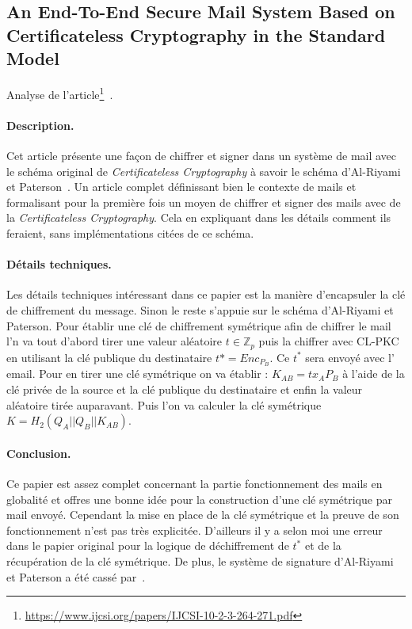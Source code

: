 \subsection{An End-To-End Secure Mail System Based on Certificateless Cryptography in the Standard Model}
Analyse de l'article\footnote{\url{https://www.ijcsi.org/papers/IJCSI-10-2-3-264-271.pdf}}~.
\paragraph*{Description.} Cet article présente une façon de chiffrer et signer dans un système de mail avec le schéma original de \textit{Certificateless Cryptography} à savoir le schéma d'Al-Riyami et Paterson~\cite{DBLP:conf/asiacrypt/Al-RiyamiP03}. Un article complet définissant bien le contexte de mails et formalisant pour la première fois un moyen de chiffrer et signer des mails avec de la \textit{Certificateless Cryptography}. Cela en expliquant dans les détails comment ils feraient, sans implémentations citées de ce schéma.
\paragraph*{Détails techniques.} Les détails techniques intéressant dans ce papier est la manière d'encapsuler la clé de chiffrement du message. Sinon le reste s'appuie sur le schéma d'Al-Riyami et Paterson.
Pour établir une clé de chiffrement symétrique afin de chiffrer le mail l'n va tout d'abord tirer une valeur aléatoire $t \in \mathbb{Z}_p$ puis la chiffrer avec CL-PKC en utilisant la clé publique du destinataire $t* = Enc_{P_B}$. Ce $t^*$ sera envoyé avec l' email. Pour en tirer une clé symétrique on va établir : $K_{AB} = tx_AP_B$ à l'aide de la clé privée de la source et la clé publique du destinataire et enfin la valeur aléatoire tirée auparavant. Puis l'on va calculer la clé symétrique $K = H_2(Q_A||Q_B||K_{AB})$.
\paragraph*{Conclusion.} Ce papier est assez complet concernant la partie fonctionnement des mails en globalité et offres une bonne idée pour la construction d'une clé symétrique par mail envoyé. Cependant la mise en place de la clé symétrique et la preuve de son fonctionnement n'est pas très explicitée. D'ailleurs il y a selon moi une erreur dans le papier original pour la logique de déchiffrement de $t^*$ et de la récupération de la clé symétrique. De plus, le système de signature d'Al-Riyami et Paterson a été cassé par~\cite{DBLP:conf/cans/HuangSMZ05}.
